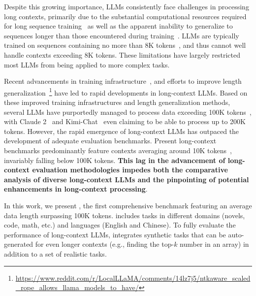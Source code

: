 Despite this growing importance, LLMs consistently face challenges in processing long contexts, primarily due to the substantial computational resources required for long sequence training~\cite{dao2022flashattention, dao2023flashattention2} as well as the apparent inability to generalize to sequences longer than those encountered during training~\cite{chen2023extending,yarn}. 
LLMs are typically trained on sequences containing no more than 8K tokens~\cite{touvron2023llama, penedo2023refinedweb, biderman2023pythia}, and thus cannot well handle contexts exceeding 8K tokens.
These limitations have largely restricted most LLMs from being applied to more complex tasks.

Recent advancements in training infrastructure~\cite{Shoeybi2019MegatronLMTM,narayanan2021efficient, dao2022flashattention, dao2023flashattention2}, and efforts to improve length generalization~\cite{anil2022exploring,Chen2023ExtendingCW,yarn}\footnote{\url{https://www.reddit.com/r/LocalLLaMA/comments/14lz7j5/ntkaware_scaled_rope_allows_llama_models_to_have/}} have led to rapid developments in long-context LLMs. 
Based on these improved training infrastructures and length generalization methods, several LLMs have purportedly managed to process data exceeding 100K tokens~\citep{yarn,gpt4turbo,Yi-6B-200K,Yi-34B-200K}, with Claude 2~\cite{claude2} and Kimi-Chat~\cite{kimi} even claiming to be able to process up to 200K tokens.
However, the rapid emergence of long-context LLMs has outpaced the development of adequate evaluation benchmarks. Present long-context benchmarks predominantly feature contexts averaging around 10K tokens~\citep{bai2023longbench, tay2020long}, invariably falling below 100K tokens. \textbf{This lag in the advancement of long-context evaluation methodologies impedes both the comparative analysis of diverse long-context LLMs and the pinpointing of potential enhancements in long-context processing}.

In this work, we present \OURSSPACE, the first comprehensive benchmark featuring an average data length surpassing 100K tokens. \OURSSPACE includes tasks in different domains (novels, code, math, etc.) and languages (English and Chinese). To fully evaluate the performance of long-context LLMs, \OURSSPACE integrates synthetic tasks that can be auto-generated for even longer contexts (e.g., finding the top-$k$ number in an array)  in addition to a set of realistic tasks. 

